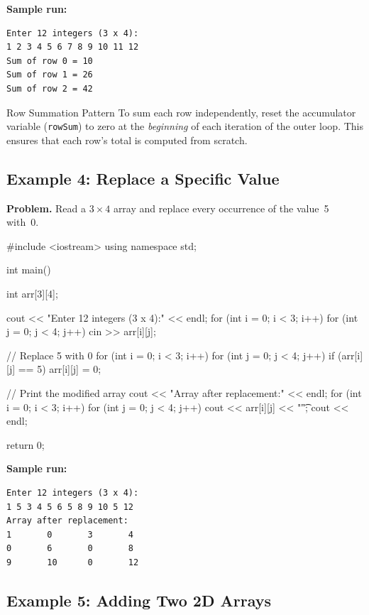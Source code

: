 \textbf{Sample run:}
\begin{verbatim}
Enter 12 integers (3 x 4):
1 2 3 4 5 6 7 8 9 10 11 12
Sum of row 0 = 10
Sum of row 1 = 26
Sum of row 2 = 42
\end{verbatim}

\begin{importantbox}{Row Summation Pattern}
To sum each row independently, reset the accumulator variable
(\texttt{rowSum}) to zero at the \emph{beginning} of each iteration of
the outer loop. This ensures that each row's total is computed from
scratch.
\end{importantbox}

\subsection{Example 4: Replace a Specific Value}

\textbf{Problem.} Read a $3 \times 4$ array and replace every
occurrence of the value~5 with~0.

\begin{cppcode}
#include <iostream>
using namespace std;

int main() {
    int arr[3][4];

    cout << "Enter 12 integers (3 x 4):" << endl;
    for (int i = 0; i < 3; i++) {
        for (int j = 0; j < 4; j++) {
            cin >> arr[i][j];
        }
    }

    // Replace 5 with 0
    for (int i = 0; i < 3; i++) {
        for (int j = 0; j < 4; j++) {
            if (arr[i][j] == 5) {
                arr[i][j] = 0;
            }
        }
    }

    // Print the modified array
    cout << "Array after replacement:" << endl;
    for (int i = 0; i < 3; i++) {
        for (int j = 0; j < 4; j++) {
            cout << arr[i][j] << "\t";
        }
        cout << endl;
    }

    return 0;
}
\end{cppcode}

\textbf{Sample run:}
\begin{verbatim}
Enter 12 integers (3 x 4):
1 5 3 4 5 6 5 8 9 10 5 12
Array after replacement:
1       0       3       4
0       6       0       8
9       10      0       12
\end{verbatim}

\subsection{Example 5: Adding Two 2D Arrays}

